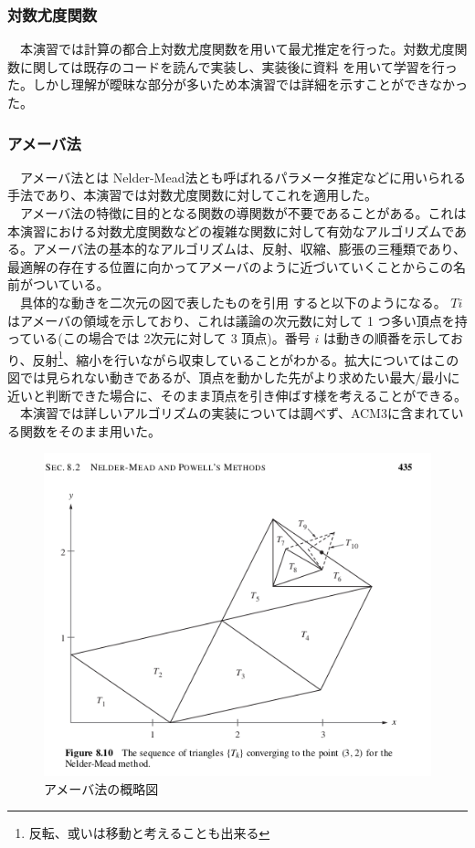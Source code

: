 \documentclass{scrartcl}
\begin{document}
\subsubsection{対数尤度関数}
\label{sec:org2b68a9a}
　本演習では計算の都合上対数尤度関数を用いて最尤推定を行った。対数尤度関数に関しては既存のコードを読んで実装し、実装後に資料 \cite{log-likelihood} を用いて学習を行った。しかし理解が曖昧な部分が多いため本演習では詳細を示すことができなかった。\\
\subsubsection{アメーバ法}
\label{sec:orgebe5474}
　アメーバ法とは Nelder-Mead法とも呼ばれるパラメータ推定などに用いられる手法であり、本演習では対数尤度関数に対してこれを適用した。\\
　アメーバ法の特徴に目的となる関数の導関数が不要であることがある。これは本演習における対数尤度関数などの複雑な関数に対して有効なアルゴリズムである。アメーバ法の基本的なアルゴリズムは、反射、収縮、膨張の三種類であり、最適解の存在する位置に向かってアメーバのように近づいていくことからこの名前がついている。\\
　具体的な動きを二次元の図で表したものを引用 \cite{nelder-mead} すると以下のようになる。 \(Ti\) はアメーバの領域を示しており、これは議論の次元数に対して 1 つ多い頂点を持っている(この場合では 2次元に対して 3 頂点)。番号 \(i\) は動きの順番を示しており、反射\footnote{反転、或いは移動と考えることも出来る}、縮小を行いながら収束していることがわかる。拡大についてはこの図では見られない動きであるが、頂点を動かした先がより求めたい最大/最小に近いと判断できた場合に、そのまま頂点を引き伸ばす様を考えることができる。\\
　本演習では詳しいアルゴリズムの実装については調べず、ACM3に含まれている関数をそのまま用いた。\\
\begin{figure}[htbp]
\centering
\includegraphics[width=15cm]{./nelder-mead.png}
\caption{アメーバ法の概略図}
\end{figure}
\end{document}
